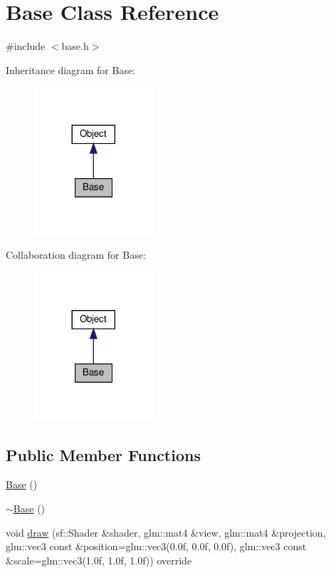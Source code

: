 \hypertarget{classBase}{}\section{Base Class Reference}
\label{classBase}


{\ttfamily \#include $<$base.\+h$>$}



Inheritance diagram for Base\+:\nopagebreak
\begin{figure}[H]
\begin{center}
\leavevmode
\includegraphics[width=125pt]{classBase__inherit__graph}
\end{center}
\end{figure}


Collaboration diagram for Base\+:\nopagebreak
\begin{figure}[H]
\begin{center}
\leavevmode
\includegraphics[width=125pt]{classBase__coll__graph}
\end{center}
\end{figure}
\subsection*{Public Member Functions}
\begin{DoxyCompactItemize}
\item 
\hyperlink{classBase_a5ffe0568374d8b9b4c4ec32953fd6453}{Base} ()
\item 
\hyperlink{classBase_a722da881b6c70cfcbde9243abcfbf334}{$\sim$\+Base} ()
\item 
void \hyperlink{classBase_ab83ee79d4522f8ad1548d5dd734a3dd5}{draw} (sf\+::\+Shader \&shader, glm\+::mat4 \&view, glm\+::mat4 \&projection, glm\+::vec3 const \&position=glm\+::vec3(0.\+0f, 0.\+0f, 0.\+0f), glm\+::vec3 const \&scale=glm\+::vec3(1.\+0f, 1.\+0f, 1.\+0f)) override
\end{DoxyCompactItemize}
